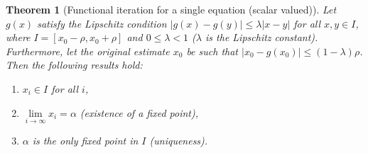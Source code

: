 \documentclass[12pt,letterpaper,DIV=11]{scrartcl}
\theoremstyle{plain}
\newtheorem{theorem}{Theorem}[section]
\theoremstyle{definition}
\theoremstyle{remark}
\begin{document}
\begin{theorem}[Functional iteration for a single equation (scalar valued)]\label{thm:iterscalar}
  Let $g(x)$ satisfy the Lipschitz condition $|g(x) - g(y)| \leq \lambda |x - y|$ for all $x, y \in I$,
  where $I = [x_0 - \rho, x_0 + \rho]$ and $0 \leq \lambda < 1$ ($\lambda$ is the Lipschitz constant).
  Furthermore, let the original estimate $x_0$ be such that $|x_0 - g(x_0)| \leq (1 - \lambda) \rho$.
  Then the following results hold: \begin{enumerate}
    \item $x_i \in I$ for all $i$,
    \item $\lim\limits_{i \to \infty} x_i = \alpha$ (existence of a fixed point),
    \item $\alpha$ is the only fixed point in $I$ (uniqueness).
  \end{enumerate}


\end{theorem}
\end{document}
